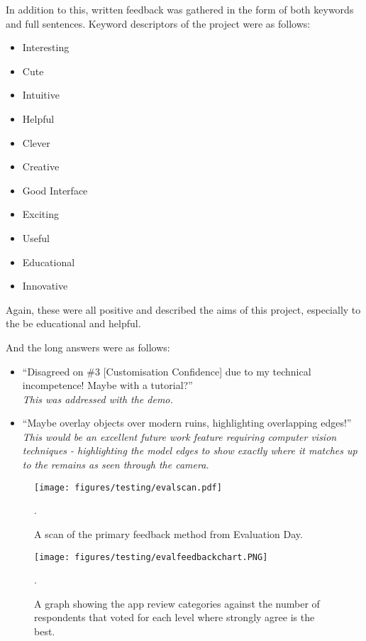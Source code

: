 \documentclass{article}
\begin{document}
In addition to this, written feedback was gathered in the form of both keywords and full sentences. Keyword descriptors of the project were as follows:
\begin{multicols}{2}
\begin{itemize}
    \item Interesting
    \item Cute
    \item Intuitive
    \item Helpful
    \item Clever
    \item Creative
\end{itemize}
\columnbreak
\begin{itemize}
    \item Good Interface
    \item Exciting
    \item Useful
    \item Educational 
    \item Innovative
\end{itemize}
\vfill\null
\end{multicols}
Again, these were all positive and described the aims of this project, especially to the be educational and helpful.

And the long answers were as follows:
\begin{itemize}
    \item ``Disagreed on \#3 [Customisation Confidence] due to my technical incompetence! Maybe with a tutorial?''\\
    \textit{This was addressed with the demo.}
    \item ``Maybe overlay objects over modern ruins, highlighting overlapping edges!'' \\
    \textit{This would be an excellent future work feature requiring computer vision techniques - highlighting the model edges to show exactly where it matches up to the remains as seen through the camera.}
\end{itemize}

\begin{figure}
    \texttt{[image: figures/testing/evalscan.pdf]}
        \caption{A scan of the primary feedback method from Evaluation Day.}.
        \label{fig:evalscan}
\end{figure}

\begin{figure}
    \texttt{[image: figures/testing/evalfeedbackchart.PNG]}
        \caption{A graph showing the app review categories against the number of respondents that voted for each level where strongly agree is the best.}.
        \label{fig:evalplot}
\end{figure}
\end{document}
